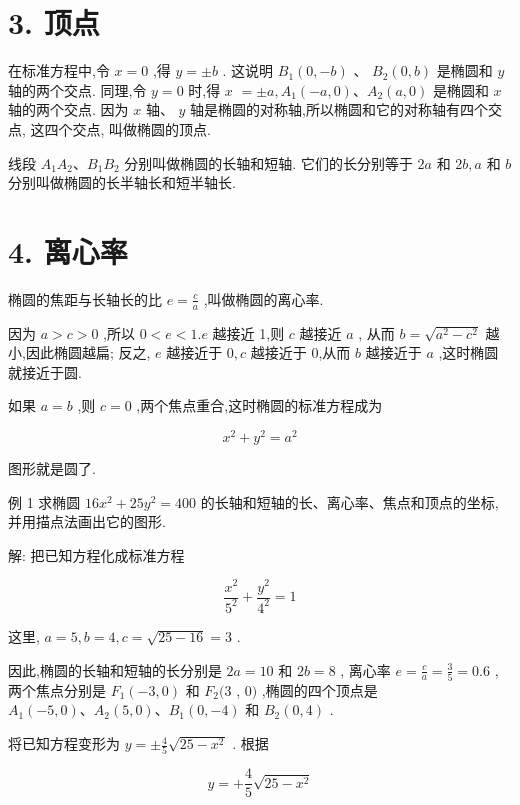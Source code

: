 \documentclass[lang=cn,newtx,10.5pt,scheme=chinese]{elegantbook}
\begin{document}
\section*{3. 顶点}

在标准方程中,令 \(x = 0\) ,得 \(y = \pm b\) . 这说明 \({B}_{1}\left( {0, - b}\right)\) 、 \({B}_{2}\left( {0,b}\right)\) 是椭圆和 \(y\) 轴的两个交点. 同理,令 \(y = 0\) 时,得 \(x\) \(= \pm a,{A}_{1}\left( {-a,0}\right) \text{、}{A}_{2}\left( {a,0}\right)\) 是椭圆和 \(x\) 轴的两个交点. 因为 \(x\) 轴、 \(y\) 轴是椭圆的对称轴,所以椭圆和它的对称轴有四个交点, 这四个交点, 叫做椭圆的顶点.

线段 \({A}_{1}{A}_{2}\text{、}{B}_{1}{B}_{2}\) 分别叫做椭圆的长轴和短轴. 它们的长分别等于 \({2a}\) 和 \({2b},a\) 和 \(b\) 分别叫做椭圆的长半轴长和短半轴长.

\section*{4. 离心率}

椭圆的焦距与长轴长的比 \(e = \frac{c}{a}\) ,叫做椭圆的离心率.

因为 \(a > c > 0\) ,所以 \(0 < e < 1.e\) 越接近 1,则 \(c\) 越接近 \(a\) , 从而 \(b = \sqrt{{a}^{2} - {c}^{2}}\) 越小,因此椭圆越扁; 反之, \(e\) 越接近于 \(0,c\) 越接近于 0,从而 \(b\) 越接近于 \(a\) ,这时椭圆就接近于圆.

如果 \(a = b\) ,则 \(c = 0\) ,两个焦点重合,这时椭圆的标准方程成为

\[
    {x}^{2} + {y}^{2} = {a}^{2}
\]

图形就是圆了.

例 1 求椭圆 \({16}{x}^{2} + {25}{y}^{2} = {400}\) 的长轴和短轴的长、离心率、焦点和顶点的坐标, 并用描点法画出它的图形.

解: 把已知方程化成标准方程

\[
  \frac{{x}^{2}}{{5}^{2}} + \frac{{y}^{2}}{{4}^{2}} = 1
\]

这里, \(a = 5,b = 4,c = \sqrt{{25} - {16}} = 3\) .

因此,椭圆的长轴和短轴的长分别是 \({2a} = {10}\) 和 \({2b} = 8\) , 离心率 \(e = \frac{c}{a} = \frac{3}{5} = {0.6}\) ,两个焦点分别是 \({F}_{1}\left( {-3,0}\right)\) 和 \({F}_{2}(3\) , \(0)\) ,椭圆的四个顶点是 \({A}_{1}\left( {-5,0}\right) \text{、}{A}_{2}\left( {5,0}\right) \text{、}{B}_{1}\left( {0, - 4}\right)\) 和 \({B}_{2}\left( {0,4}\right)\) .

将已知方程变形为 \(y = \pm \frac{4}{5}\sqrt{{25} - {x}^{2}}\) . 根据

\[
  y = + \frac{4}{5}\sqrt{{25} - {x}^{2}}
\]
\end{document}
